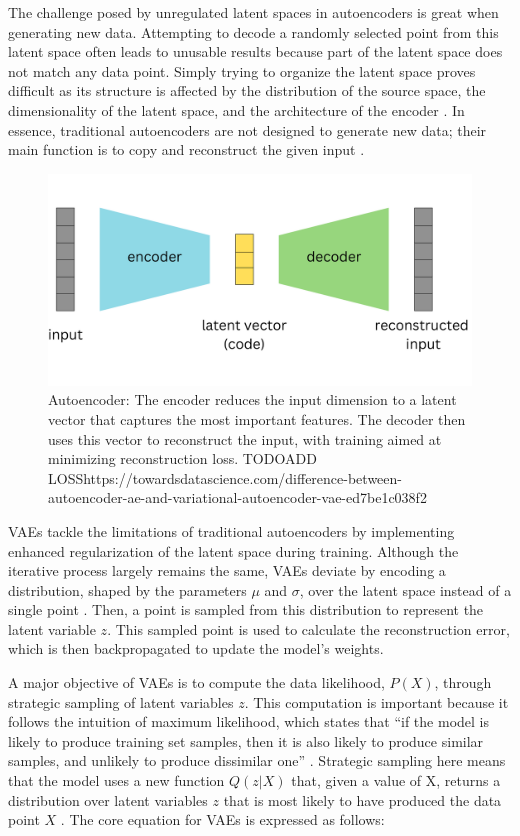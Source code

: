 The challenge posed by unregulated latent spaces in autoencoders is great when generating new data. Attempting to decode a randomly selected point from this latent space often leads to unusable results because part of the latent space does not match any data point. Simply trying to organize the latent space proves difficult as its structure is affected by the distribution of the source space, the dimensionality of the latent space, and the architecture of the encoder \citep{michelucci2022introduction}.
In essence, traditional autoencoders are not designed to generate new data; their main function is to copy and reconstruct the given input \citep{GoodfellowDeepLearning}.

\begin{figure}[ht]
    \centering
      \hspace{.8cm}
      \includegraphics[width=.7\columnwidth]{figures/Autoencoder.png}
      \caption{Autoencoder: The encoder reduces the input dimension to a latent vector that captures the most important features. The decoder then uses this vector to reconstruct the input, with training aimed at minimizing reconstruction loss. TODO\@ ADD LOSS\@ https://towardsdatascience.com/difference-between-autoencoder-ae-and-variational-autoencoder-vae-ed7be1c038f2}\label{fig:figureAE}
\end{figure}

VAEs tackle the limitations of traditional autoencoders by implementing enhanced regularization of the latent space during training. Although the iterative process largely remains the same, VAEs deviate by encoding a distribution, shaped by the parameters \(\mu\) and \(\sigma\), over the latent space instead of a single point \citep{doerschVAE}. Then, a point is sampled from this distribution to represent the latent variable \(z\). This sampled point is used to calculate the reconstruction error, which is then backpropagated to update the model's weights.

A major objective of VAEs is to compute the data likelihood, \(P(X)\), through strategic sampling of latent variables \(z\). This computation is important because it follows the intuition of maximum likelihood, which states that ``if the model is likely to produce training set samples, then it is also likely to produce similar samples, and unlikely to produce dissimilar one'' \citep{doerschVAE}. Strategic sampling here means that the model uses a new function \(Q(z|X)\) that, given a value of X, returns a distribution over latent variables \(z\) that is most likely to have produced the data point \(X\) \citep{doerschVAE}. The core equation for VAEs is expressed as follows:


